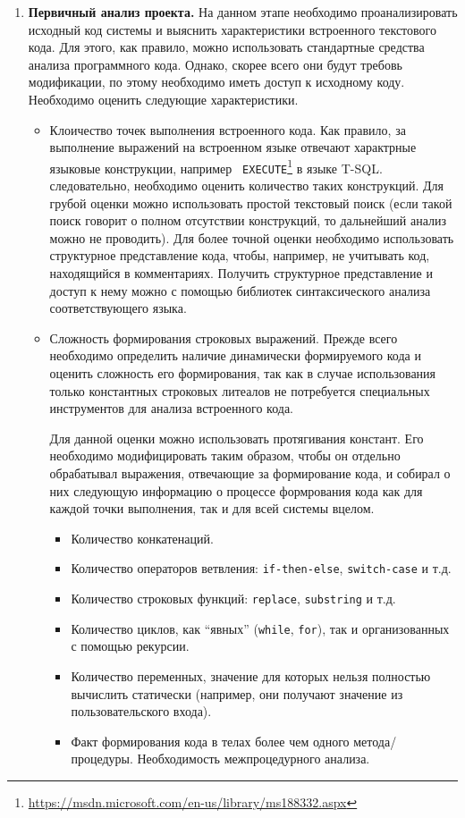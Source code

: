 \begin{enumerate}
  \item \textbf{Первичный анализ проекта.} На данном этапе необходимо проанализировать исходный код системы и выяснить характеристики встроенного текстового кода. Для этого, как правило, можно использовать стандартные средства анализа программного кода. Однако, скорее всего они будут требовь модификации, по этому необходимо иметь доступ к исходному коду. Необходимо оценить следующие характеристики.
  \begin{itemize}
    \item Клоичество точек выполнения встроенного кода. Как правило, за выполнение выражений на встроенном языке отвечают характрные языковые конструкции, например \verb| EXECUTE|\footnote{\url{https://msdn.microsoft.com/en-us/library/ms188332.aspx}} в языке T-SQL. следовательно, необходимо оценить количество таких конструкций. Для грубой оценки можно использовать простой текстовый поиск (если такой поиск говорит о полном отсутствии конструкций, то дальнейший анализ можно не проводить). Для более точной оценки необходимо использовать структурное представление кода, чтобы, например, не учитывать код, находящийся в комментариях. Получить структурное представление и доступ к нему можно с помощью библиотек синтаксического анализа соответствующего языка.
    
    \item Сложность формирования строковых выражений. Прежде всего необходимо определить наличие динамически формируемого кода и оценить сложность его формирования, так как в случае использования только константных строковых литеалов не потребуется специальных инструментов для анализа встроенного кода.
    
    Для данной оценки можно использовать протягивания констант. Его необходимо модифицировать таким образом, чтобы он отдельно обрабатывал выражения, отвечающие за формирование кода, и собирал о них следующую информацию о процессе формрования кода как для каждой точки выполнения, так и для всей системы вцелом.
    \begin{itemize}
      \item Количество конкатенаций.
      \item Количество операторов ветвления: \verb|if-then-else|, \verb|switсh-case| и т.д.
      \item Количество строковых функций: \verb|replace|, \verb|substring| и т.д.
      \item Количество циклов, как ``явных'' (\verb|while|, \verb|for|), так и организованных с помощью рекурсии.
      \item Количество переменных, значение для которых нельзя полностью вычислить статически (например, они получают значение из пользовательского входа).
      \item Факт формирования кода в телах более чем одного метода/процедуры. Необходимость межпроцедурного анализа.
    \end{itemize}
  \end{itemize}
  

\end{enumerate}
